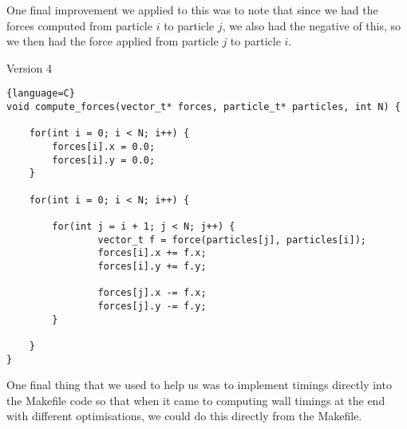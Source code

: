 One final improvement we applied to this was to note that since we had the forces computed from particle $i$ to particle $j$, we also had the negative of this, so we then had the force applied from particle $j$ to particle $i$.
\begin{center}
    Version 4
\end{center}
\begin{lstlisting}{language=C}
void compute_forces(vector_t* forces, particle_t* particles, int N) {

    for(int i = 0; i < N; i++) {
        forces[i].x = 0.0;
        forces[i].y = 0.0;
    }

    for(int i = 0; i < N; i++) {

        for(int j = i + 1; j < N; j++) {
                vector_t f = force(particles[j], particles[i]);
                forces[i].x += f.x;
                forces[i].y += f.y;

                forces[j].x -= f.x;
                forces[j].y -= f.y;
        }

    }
}
\end{lstlisting}
One final thing that we used to help us was to implement timings directly into the Makefile code so that when it came to computing wall timings at the end with different optimisations, we could do this directly from the Makefile.
\np
